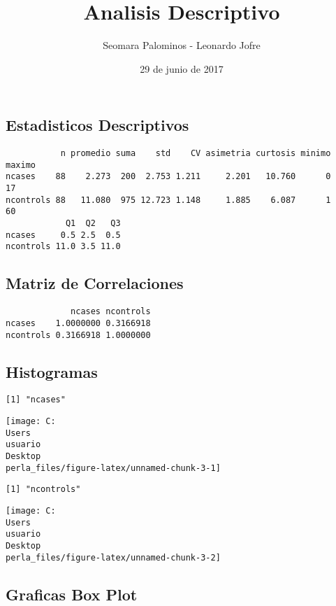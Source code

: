 \documentclass[]{article}
\title{Analisis Descriptivo}
\author{Seomara Palominos - Leonardo Jofre}
\date{29 de junio de 2017}
\begin{document}
\maketitle

\subsection{Estadisticos Descriptivos}\label{estadisticos-descriptivos}

\begin{verbatim}
           n promedio suma    std    CV asimetria curtosis minimo maximo
ncases    88    2.273  200  2.753 1.211     2.201   10.760      0     17
ncontrols 88   11.080  975 12.723 1.148     1.885    6.087      1     60
            Q1  Q2   Q3
ncases     0.5 2.5  0.5
ncontrols 11.0 3.5 11.0
\end{verbatim}

\subsection{Matriz de Correlaciones}\label{matriz-de-correlaciones}

\begin{verbatim}
             ncases ncontrols
ncases    1.0000000 0.3166918
ncontrols 0.3166918 1.0000000
\end{verbatim}

\pagebreak

\subsection{Histogramas}\label{histogramas}

\begin{verbatim}
[1] "ncases"
\end{verbatim}

\begin{center}\texttt{[image: C:\\Users\\usuario\\Desktop\\perla\_files/figure-latex/unnamed-chunk-3-1]} \end{center}

\begin{verbatim}
[1] "ncontrols"
\end{verbatim}

\begin{center}\texttt{[image: C:\\Users\\usuario\\Desktop\\perla\_files/figure-latex/unnamed-chunk-3-2]} \end{center}

\subsection{Graficas Box Plot}\label{graficas-box-plot}
\end{document}
